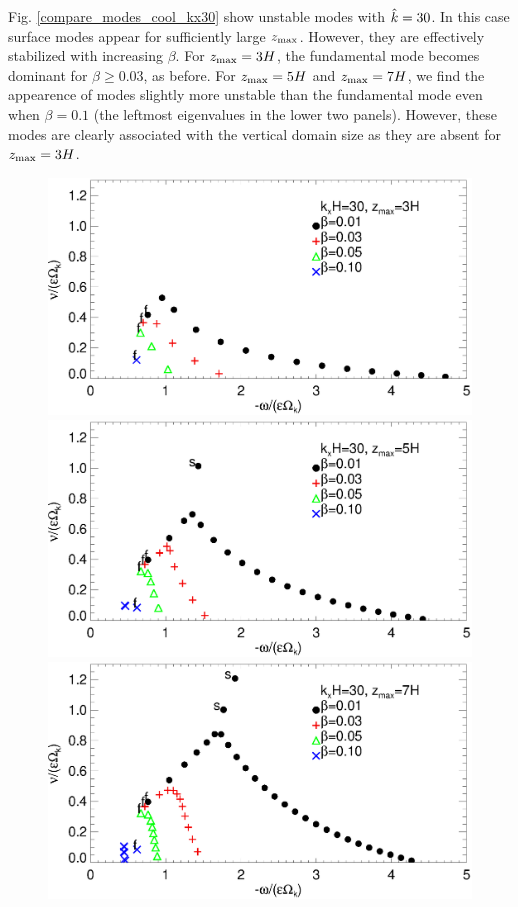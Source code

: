 Fig. \ref{compare_modes_cool_kx30} show unstable modes with
$\hat{k}=30$. In this case surface modes appear for sufficiently large   
$z_\mathrm{max}$. However, they are effectively stabilized with increasing 
$\beta$. For $z_\mathrm{max}=3H$, the fundamental mode becomes dominant for
$\beta\geq 0.03$, as before. For $z_\mathrm{max}=5H$ and $z_\mathrm{max}=7H$, we find
the appearence of modes slightly more unstable than the fundamental
mode even when $\beta=0.1$ (the leftmost eigenvalues in the lower two
panels). However, these modes are clearly associated with the vertical
domain size as they are absent for $z_\mathrm{max}=3H$. %

\begin{figure}
  \includegraphics[width=\linewidth,clip=true,trim=0cm 1.75cm 0cm
  0cm]{figures/compare_modes_cool_kx30_z3.ps} 
  \includegraphics[width=\linewidth,clip=true,trim=0cm 1.75cm 0cm
  0cm]{figures/compare_modes_cool_kx30_z5.ps}
  \includegraphics[width=\linewidth]{figures/compare_modes_cool_kx30_z7.ps}

\end{figure}
